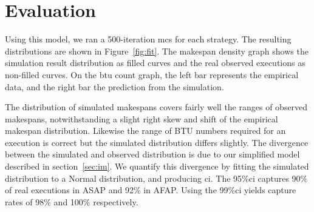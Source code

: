 \documentclass[10pt,conference,compsocconf]{IEEEtran}
\begin{document}

\section{Evaluation}
\label{sec:eval}
Using this model,  we ran a 500-iteration \ac{mcs} for each strategy.
The  resulting distributions are  shown  in  Figure~\ref{fig:fit}. 
The makespan  density  graph  shows the simulation  result  distribution as
filled  curves and the  real  observed executions as non-filled 
curves. On the \ac{btu} count graph, the left bar represents
the empirical data, and the right  bar the prediction from the simulation. 

The distribution  of simulated makespans covers fairly  well the
ranges of  observed makespans, notwithstanding a  slight right skew and shift of
the empirical makespan distribution. Likewise the range of BTU numbers required 
for an execution is correct but the simulated distribution differs slightly. The
divergence between the simulated and observed distribution is due to our
simplified model described in section~\ref{sec:im}. We quantify this divergence
by fitting the simulated distribution to a Normal distribution, and producing
\ac{ci}. The 95\%\ac{ci} captures 90\% of real executions in ASAP and 92\% in
AFAP. Using the 99\%\ac{ci} yields capture rates of 98\% and 100\% respectively.
\end{document}
